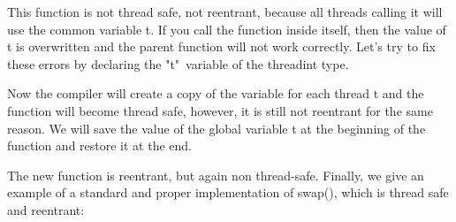 {	\begin{figure}[H]
		
	\end{figure}
	\par This function is not thread safe, not reentrant, because all threads calling it will use the common variable t. If you call the function inside itself, then the value of t is overwritten and the parent function will not work correctly. Let's try to fix these errors by declaring the "t"\ variable of the \textunderscore \textunderscore threadint type.
	\begin{figure}[H]
		
	\end{figure}
	\par Now the compiler will create a copy of the variable for each thread t and the function will become thread safe, however, it is still not reentrant for the same reason. We will save the value of the global variable t at the beginning of the function and restore it at the end.
	\begin{figure}[H]
		
	\end{figure}
	\par The new function is reentrant, but again non thread-safe. Finally, we give an example of a standard and proper implementation of swap(), which is thread safe and reentrant:
	\begin{figure}[H]
		
	\end{figure}
}